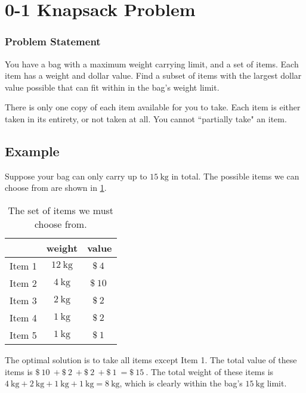 \section{0-1 Knapsack Problem}%
\label{sec:0-1-knapsack-problem}


\subsubsection{Problem Statement}

You have a bag with a maximum weight carrying limit, and a set of items. Each item has a weight and dollar value. Find a subset of items with the largest dollar value possible that can fit within in the bag's weight limit.

There is only one copy of each item available for you to take. Each item is either taken in its entirety, or not taken at all. You cannot ``partially take" an item.


\subsection{Example}
\label{sub:0-1-knapsack-problem--example}

Suppose your bag can only carry up to $\qty{15}{\kilo\gram}$ in total. The possible items we can choose from are shown in \cref{tab:0-1-knapsack-problem--example-items}.

\begin{table}[H]
    \centering
    \caption{The set of items we must choose from.}
    \label{tab:0-1-knapsack-problem--example-items}
    \begin{tabular}{l||c|c}
        & weight & value \\ \hline\hline
        Item 1 & $\qty{12}{\kilo\gram}$ & $\SI{4}[\$]{}$ \\ \hline
        Item 2 & $\qty{4}{\kilo\gram}$ & $\SI{10}[\$]{}$ \\ \hline
        Item 3 & $\qty{2}{\kilo\gram}$ & $\SI{2}[\$]{}$ \\ \hline
        Item 4 & $\qty{1}{\kilo\gram}$ & $\SI{2}[\$]{}$ \\ \hline
        Item 5 & $\qty{1}{\kilo\gram}$ & $\SI{1}[\$]{}$ \\ \hline
    \end{tabular}
\end{table}

The optimal solution is to take all items except Item 1. The total value of these items is $\SI{10}[\$]{} + \SI{2}[\$]{} + \SI{2}[\$]{} + \SI{1}[\$]{} = \SI{15}[\$]{}$. The total weight of these items is $\qty{4}{\kilo\gram} + \qty{2}{\kilo\gram} + \qty{1}{\kilo\gram} + \qty{1}{\kilo\gram} = \qty{8}{\kilo\gram}$, which is clearly within the bag's $\qty{15}{\kilo\gram}$ limit.

